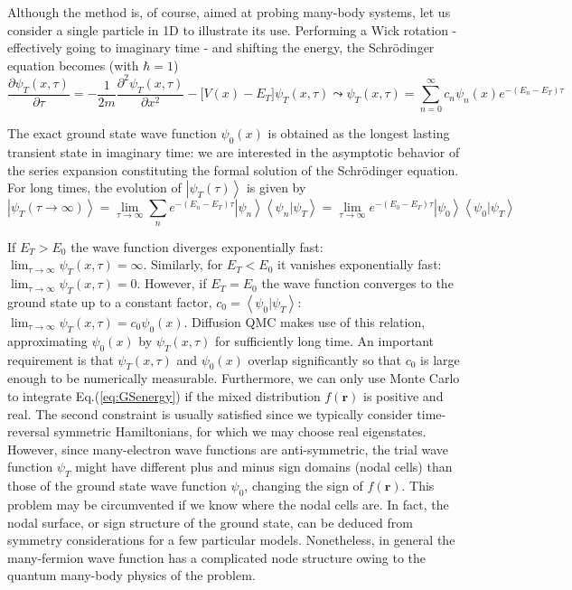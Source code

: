 Although the method is, of course, aimed at probing many-body systems, let us consider a single particle in \acs{1D} to illustrate its use.
Performing a Wick rotation - effectively going to imaginary time - and shifting the energy, the Schr\"odinger equation becomes (with $\hbar = 1$)
\begin{equation}
\frac{\partial \psi_T ( x, \tau )}{\partial\tau}  = -\frac{1}{2m}\frac{\partial^2 \psi_T ( x, \tau )}{\partial x^2} - \bigg[ V(x) - E_T \bigg] \psi_T( x, \tau )  \leadsto \psi_T (x, \tau) = \sum_{n=0}^{\infty} c_n \psi_n (x) e^{-(E_n - E_T)\tau}
\end{equation}

The exact ground state wave function $\psi_0 ( x )$ is obtained as the longest lasting transient state in imaginary time: we are interested in the asymptotic behavior of the series expansion constituting the formal solution of the Schr\"odinger equation.
For long times, the evolution of $\left| \psi_T (\tau) \right\rangle $ is given by
\begin{equation}\label{eq:im_ev}
\left| \psi_T (\tau \rightarrow \infty) \right\rangle = \lim_{\tau \rightarrow \infty} \sum_n e^{-(E_n - E_T) \tau} \left|\psi_n \right\rangle \left\langle \psi_n | \psi_T \right\rangle = \lim_{\tau \rightarrow \infty} e^{-(E_0 - E_T)\tau} \left| \psi_0 \right\rangle \left\langle \psi_0 | \psi_T \right\rangle 
\end{equation}

If $E_T > E_0$ the wave function diverges exponentially fast: $\lim_{\tau \rightarrow \infty} \psi_T ( x, \tau) = \infty$.
Similarly, for $E_T < E_0$ it vanishes exponentially fast: $\lim_{\tau \rightarrow \infty} \psi_T ( x, \tau) = 0$.
However, if $E_T = E_0$ the wave function converges to the ground state up to a constant factor, $c_0 = \left\langle \psi_0 | \psi_T \right\rangle$: 
$
\lim_{\tau \rightarrow \infty} \psi_T ( x, \tau) = c_0 \psi_0 (x)
$.
Diffusion \ac{QMC} makes use of this relation, approximating $\psi_0(x)$ by $\psi_T (x, \tau)$ for sufficiently long time.
An important requirement is that $\psi_T (x, \tau)$ and $\psi_0(x)$ overlap significantly so that $c_0$ is large enough to be numerically measurable.
Furthermore, we can only use Monte Carlo to integrate Eq.(\ref{eq:GSenergy}) if the mixed distribution $f(\bm r)$ is positive and real.
The second constraint is usually satisfied since we typically consider time-reversal symmetric Hamiltonians, for which we may choose real eigenstates.
However, since many-electron wave functions are anti-symmetric, the trial wave function $\psi_T$ might have different plus and minus sign domains (nodal cells) than those of the ground state wave function $\psi_0$, changing the sign of $f ( \bm r )$.
This problem may be circumvented if we know where the nodal cells are.
In fact, the nodal surface, or sign structure of the ground state, can be deduced from symmetry considerations for a few particular models.
Nonetheless, in general the many-fermion wave function has a complicated node structure owing to the quantum many-body physics of the problem.

